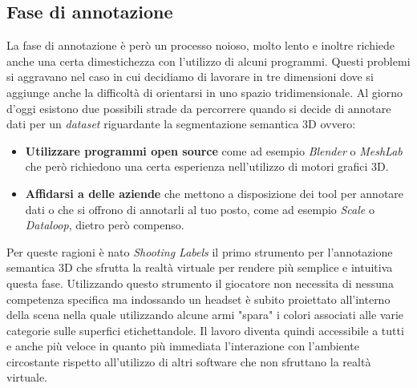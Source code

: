 \subsection{Fase di annotazione}
La fase di annotazione è però un processo noioso, molto lento e inoltre richiede anche una certa dimestichezza con l'utilizzo di alcuni programmi. Questi problemi si aggravano nel caso in cui decidiamo di lavorare in tre dimensioni dove si aggiunge anche la difficoltà di orientarsi in uno spazio tridimensionale. Al giorno d'oggi esistono due possibili strade da percorrere quando si decide di annotare dati per un \textit{dataset} riguardante la segmentazione semantica 3D ovvero: 
\begin{itemize}
	\item \textbf{Utilizzare programmi open source} come ad esempio \textit{Blender} o \textit{MeshLab} che però richiedono una certa esperienza nell'utilizzo di motori grafici 3D. 
	\item \textbf{Affidarsi a delle aziende} che mettono a disposizione dei tool per annotare dati o che si offrono di annotarli al tuo posto, come ad esempio \textit{Scale} o \textit{Dataloop}, dietro però compenso.
\end{itemize}
Per queste ragioni è nato \textit{Shooting Labels} il primo strumento per l'annotazione semantica 3D che sfrutta la realtà virtuale per rendere più semplice e intuitiva questa fase. Utilizzando questo strumento il giocatore non necessita di nessuna competenza specifica ma indossando un headset è subito proiettato all'interno della scena nella quale utilizzando alcune armi "spara" i colori associati alle varie categorie sulle superfici etichettandole. Il lavoro diventa quindi accessibile a tutti e anche più veloce in quanto più immediata l'interazione con l'ambiente circostante rispetto all'utilizzo di altri software che non sfruttano la realtà virtuale. \\\\





